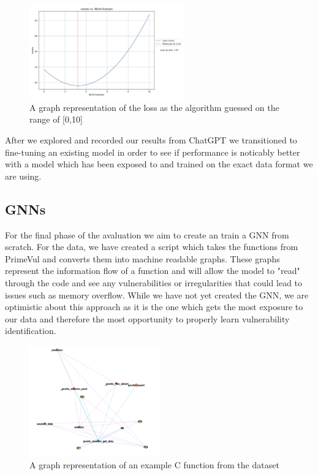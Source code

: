 \documentclass{article}
\begin{document}
\begin{figure}[htbp]
    \centering
    \includegraphics[width=0.6\textwidth]{images/naive_function.png}
    \caption{A graph representation of the loss as the algorithm guessed on the range of [0,10]}
    \label{fig:naive_function}
\end{figure}

After we explored and recorded our results from ChatGPT we transitioned to fine-tuning an existing model
in order to see if performance is noticably better with a model which has been exposed to and trained
on the exact data format we are using. 

\subsection{GNNs}
For the final phase of the avaluation we aim to create an train a GNN from scratch. For the data, we have 
created a script which takes the functions from PrimeVul and converts them into machine readable graphs. 
These graphs represent the information flow of a function and will allow the model to "read" through the code
and see any vulnerabilities or irregularities that could lead to issues such as memory overflow. While we have 
not yet created the GNN, we are optimistic about this approach as it is the one which gets the most exposure
to our data and therefore the most opportunity to properly learn vulnerability identification.

\begin{figure}[htbp]
    \centering
    \includegraphics[width=0.5\textwidth]{images/gnn_data.png}
    \caption{A graph representation of an example C function from the dataset}
    \label{fig:gnn_data}
\end{figure}
\end{document}
